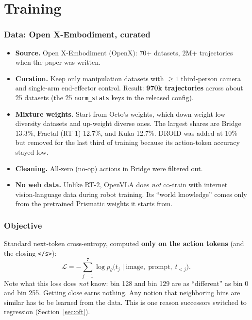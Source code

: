 \documentclass[11pt]{article}
\begin{document}
\part{Training}

\section{Data: Open X-Embodiment, curated}

\begin{itemize}
  \item \textbf{Source.} Open X-Embodiment (OpenX): 70+ datasets, 2M+ trajectories when the paper was written.
  \item \textbf{Curation.} Keep only manipulation datasets with $\ge 1$ third-person camera and single-arm end-effector control. Result: \textbf{970k trajectories} across about 25 datasets (the 25 \texttt{norm\_stats} keys in the released config).
  \item \textbf{Mixture weights.} Start from Octo's weights, which down-weight low-diversity datasets and up-weight diverse ones. The largest shares are Bridge 13.3\%, Fractal (RT-1) 12.7\%, and Kuka 12.7\%. DROID was added at 10\% but removed for the last third of training because its action-token accuracy stayed low.
  \item \textbf{Cleaning.} All-zero (no-op) actions in Bridge were filtered out.
  \item \textbf{No web data.} Unlike RT-2, OpenVLA does \emph{not} co-train with internet vision-language data during robot training. Its ``world knowledge'' comes only from the pretrained Prismatic weights it starts from.
\end{itemize}

\section{Objective}

Standard next-token cross-entropy, computed \textbf{only on the action tokens} (and the closing \texttt{</s>}):
\begin{equation}
\mathcal{L} = -\sum_{j=1}^{7}\log p_\theta\big(t_j \mid \text{image},\;\text{prompt},\;t_{<j}\big).
\end{equation}
Note what this loss does \emph{not} know: bin 128 and bin 129 are as ``different'' as bin 0 and bin 255. Getting close earns nothing. Any notion that neighboring bins are similar has to be learned from the data. This is one reason successors switched to regression (Section~\ref{sec:oft}).
\end{document}
